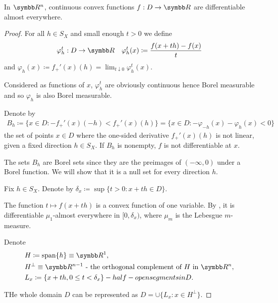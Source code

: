 \begin{theorem}\label{thm:rn_continuous_convex_frechet_almost_everywhere}\cite[exercise 1.17]{Phelps1993}
  In \( \BR^n \), continuous convex functions \( f: D \to \BR \) are differentiable almost everywhere.
\end{theorem}
\begin{proof}
  For all \( h \in S_X \) and small enough \( t > 0 \) we define
  \begin{align*}
    &\varphi_h^t: D \to \BR
    &\varphi_h^t(x) \coloneqq \frac {f(x + th) - f(x)} t
  \end{align*}
  and \( \varphi_h(x) \coloneqq f_+'(x)(h) = \lim_{t \downarrow 0} \varphi_h^t(x) \).

  Considered as functions of \( x \), \( \varphi_h^t \) are obviously continuous hence Borel measurable and so \( \varphi_h \) is also Borel measurable.

  Denote by
  \begin{align*}
    B_h
    \coloneqq
    \{ x \in D \colon -f_+'(x)(-h) < f_+'(x)(h) \}
    =
    \{ x \in D \colon -\varphi_{-h}(x) - \varphi_h(x) < 0 \}
  \end{align*}
  the set of points \( x \in D \) where the one-sided derivative \( f_+'(x)(h) \) is not linear, given a fixed direction \( h \in S_X \). If \( B_h \) is nonempty, \( f \) is not differentiable at \( x \).

  The sets \( B_h \) are Borel sets since they are the preimages of \( (-\infty, 0) \) under a Borel function. We will show that it is a null set for every direction \( h \).

  Fix \( h \in S_X \). Denote by \( \delta_x \coloneqq \sup \{ t > 0 \colon x + th \in D \} \).

  The function \( t \mapsto f(x + th) \) is a convex function of one variable. By \cite[theorem 1.16]{Phelps1993}, it is differentiable \( \mu_1 \)-almost everywhere in \( [0, \delta_x) \), where \( \mu_m \) is the Lebesgue \( m \)-measure.

  Denote
  \begin{align*}
    &H \coloneqq \Span\{ h \} \equiv \BR^1,
    \\
    &H^\perp \equiv \BR^{n-1} \text{ - the orthogonal complement of \( H \) in \( \BR^n \)},
    \\
    &L_x \coloneqq \{ x + th, 0 \leq t < \delta_x \} - half-open segments in D.
  \end{align*}

  THe whole domain \( D \) can be represented as \( D = \cup \{ L_x \colon x \in H^\perp \} \).


\end{proof}
